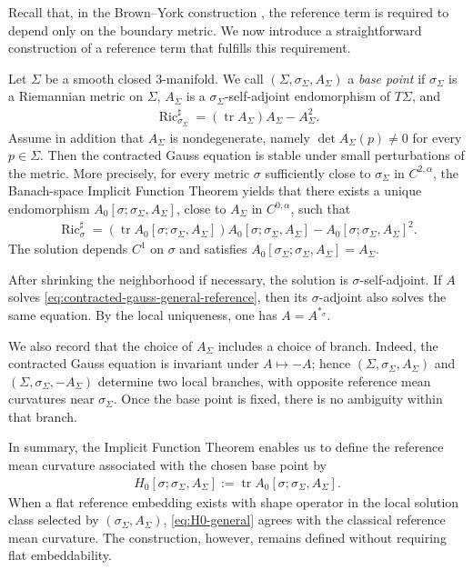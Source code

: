 \documentclass[10pt,a4paper]{amsart}
\newcommand{\tr}{\operatorname{tr}}
\newcommand{\Ric}{\operatorname{Ric}}
\begin{document}
	Recall that, in the Brown--York construction \cite{BrownYork}, the reference term is
	required to depend only on the boundary metric. We now introduce a straightforward construction of a reference term that fulfills this requirement.
	
	Let $\Sigma$ be a smooth closed $3$-manifold. We call
	$(\Sigma,\sigma_\Sigma,A_\Sigma)$ a \emph{base point} if $\sigma_\Sigma$ is a
	Riemannian metric on $\Sigma$, $A_\Sigma$ is a $\sigma_\Sigma$-self-adjoint
	endomorphism of $T\Sigma$, and
	\begin{align}
		\Ric_{\sigma_\Sigma}^{\sharp}
		=
		(\tr A_\Sigma)A_\Sigma
		-
		A_\Sigma^2 .
	\end{align}
	Assume in addition that $A_\Sigma$ is nondegenerate, namely
	$\det A_\Sigma(p)\neq 0$ for every $p\in\Sigma$. Then the contracted Gauss
	equation is stable under small perturbations of the metric. More precisely, for
	every metric $\sigma$ sufficiently close to $\sigma_\Sigma$ in $C^{2,\alpha}$, the Banach-space Implicit Function Theorem yields that there exists a unique endomorphism
	$A_0[\sigma;\sigma_\Sigma,A_\Sigma]$, close to $A_\Sigma$ in $C^{0,\alpha}$,
	such that
	\begin{align}\label{eq:contracted-gauss-general-reference}
		\Ric_{\sigma}^{\sharp}
		=
		(\tr A_0[\sigma;\sigma_\Sigma,A_\Sigma])
		A_0[\sigma;\sigma_\Sigma,A_\Sigma]
		-
		A_0[\sigma;\sigma_\Sigma,A_\Sigma]^2 .
	\end{align}
	The solution depends $C^1$ on $\sigma$ and satisfies
	$A_0[\sigma_\Sigma;\sigma_\Sigma,A_\Sigma]=A_\Sigma$.
	
	After shrinking the neighborhood if necessary, the solution is
	$\sigma$-self-adjoint. If $A$ solves \eqref{eq:contracted-gauss-general-reference},
	then its $\sigma$-adjoint also solves the same equation. By the local uniqueness,
	one has $A=A^{*_\sigma}$.
	
	We also record that the choice of $A_\Sigma$ includes a choice of branch. Indeed,
	the contracted Gauss equation is invariant under $A\mapsto -A$; hence
	$(\Sigma,\sigma_\Sigma,A_\Sigma)$ and
	$(\Sigma,\sigma_\Sigma,-A_\Sigma)$ determine two local branches, with opposite
	reference mean curvatures near $\sigma_\Sigma$. Once the base point is fixed,
	there is no ambiguity within that branch.
	
	In summary, the Implicit Function Theorem enables us to define the reference mean curvature associated with the chosen base point by
	\begin{align}\label{eq:H0-general}
		H_0[\sigma;\sigma_\Sigma,A_\Sigma]
		:=
		\tr A_0[\sigma;\sigma_\Sigma,A_\Sigma].
	\end{align}
	When a flat reference embedding exists with shape operator in the local solution
	class selected by $(\sigma_\Sigma,A_\Sigma)$, \eqref{eq:H0-general} agrees with
	the classical reference mean curvature. The construction, however, remains
	defined without requiring flat embeddability.
	
\end{document}
